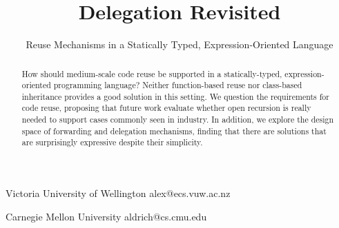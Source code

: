 \documentclass[preprint]{sigplanconf}
\begin{document}
\setlength{\pdfpageheight}{\paperheight}
\setlength{\pdfpagewidth}{\paperwidth}




\title{Delegation Revisited}
\subtitle{Reuse Mechanisms in a Statically Typed, Expression-Oriented Language}

           {Victoria University of Wellington}
           {alex@ecs.vuw.ac.nz}

           {Carnegie Mellon University}
           {aldrich@cs.cmu.edu}
		   		   
\maketitle

\begin{abstract}
How should medium-scale code reuse be supported in a statically-typed,
expression-oriented programming language?  Neither function-based
reuse nor class-based inheritance provides a good solution in this
setting.  We question the requirements for code reuse, proposing that
future work evaluate whether open recursion is really needed to support
cases commonly seen in industry.  In addition, we explore the design
space of forwarding and delegation mechanisms, finding that there are
solutions that are surprisingly expressive despite their simplicity.


\end{abstract}
\end{document}

